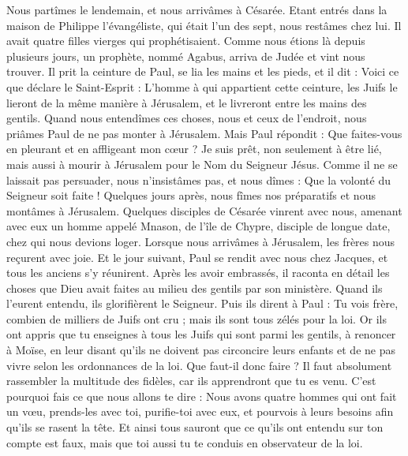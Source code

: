 \begin{multicols}{2}
Nous partîmes le lendemain, et nous arrivâmes à Césarée. Etant entrés dans la maison de Philippe l'évangéliste, qui était l'un des sept, nous restâmes chez lui.
Il avait quatre filles vierges qui prophétisaient.
Comme nous étions là depuis plusieurs jours, un prophète, nommé Agabus, arriva de Judée
et vint nous trouver. Il prit la ceinture de Paul, se lia les mains et les pieds, et il dit : Voici ce que déclare le Saint-Esprit : L’homme à qui appartient cette ceinture, les Juifs le lieront de la même manière à Jérusalem, et le livreront entre les mains des gentils.
Quand nous entendîmes ces choses, nous et ceux de l’endroit, nous priâmes Paul de ne pas monter à Jérusalem.
Mais Paul répondit : Que faites-vous en pleurant et en affligeant mon cœur ? Je suis prêt, non seulement à être lié, mais aussi à mourir à Jérusalem pour le Nom du Seigneur Jésus.
Comme il ne se laissait pas persuader, nous n’insistâmes pas, et nous dîmes : Que la volonté du Seigneur soit faite !
Quelques jours après, nous fîmes nos préparatifs et nous montâmes à Jérusalem.
Quelques disciples de Césarée vinrent avec nous, amenant avec eux un homme appelé Mnason, de l’île de Chypre, disciple de longue date, chez qui nous devions loger.
Lorsque nous arrivâmes à Jérusalem, les frères nous reçurent avec joie.
Et le jour suivant, Paul se rendit avec nous chez Jacques, et tous les anciens s’y réunirent.
Après les avoir embrassés, il raconta en détail les choses que Dieu avait faites au milieu des gentils par son ministère.
Quand ils l’eurent entendu, ils glorifièrent le Seigneur. Puis ils dirent à Paul : Tu vois frère, combien de milliers de Juifs ont cru ; mais ils sont tous zélés pour la loi.
Or ils ont appris que tu enseignes à tous les Juifs qui sont parmi les gentils, à renoncer à Moïse, en leur disant qu’ils ne doivent pas circoncire leurs enfants et de ne pas vivre selon les ordonnances de la loi.
Que faut-il donc faire ? Il faut absolument rassembler la multitude des fidèles, car ils apprendront que tu es venu.
C’est pourquoi fais ce que nous allons te dire : Nous avons quatre hommes qui ont fait un vœu,
prends-les avec toi, purifie-toi avec eux, et pourvois à leurs besoins afin qu'ils se rasent la tête. Et ainsi tous sauront que ce qu’ils ont entendu sur ton compte est faux, mais que toi aussi tu te conduis en observateur de la loi.

\end{multicols}
